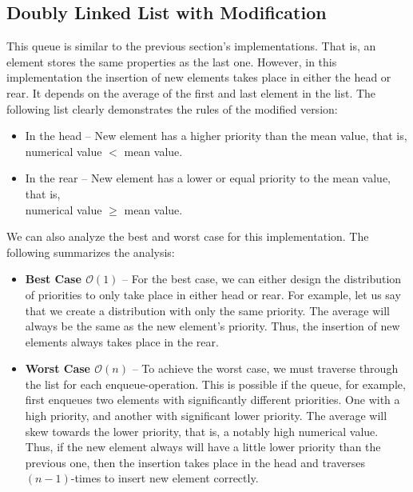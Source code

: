 \documentclass[a4paper,11pt]{kth-mag}
\newcommand*{\skippara}{\par\vspace{\baselineskip} \noindent}
\begin{document}
\subsection{Doubly Linked List with Modification}
This queue is similar to the previous section's implementations.
That is, an element stores the same properties as the last one.
However, in this implementation the insertion of new elements takes place in either the head or rear.
It depends on the average of the first and last element in the list.
The following list clearly demonstrates the rules of the modified version:
\begin{itemize}
    \item In the head -- New element has a higher priority than the mean value, that is, \\numerical value $<$ mean value.
    \item In the rear -- New element has a lower or equal priority to the mean value, that is,\\numerical value $\ge$ mean value.
\end{itemize}

\skippara We can also analyze the best and worst case for this implementation.
The following summarizes the analysis:
\begin{itemize}
    \item \textbf{Best Case $\mathcal{O}(1)$} -- For the best case, we can either design the distribution of priorities to only take place in either head or rear.
        For example, let us say that we create a distribution with only the same priority.
        The average will always be the same as the new element's priority.
        Thus, the insertion of new elements always takes place in the rear.
    \item \textbf{Worst Case $\mathcal{O}(n)$} -- To achieve the worst case, we must traverse through the list for each enqueue-operation.
        This is possible if the queue, for example, first enqueues two elements with significantly different priorities.
        One with a high priority, and another with significant lower priority.
        The average will skew towards the lower priority, that is, a notably high numerical value.
        Thus, if the new element always will have a little lower priority than the previous one, then the insertion takes place in the head and traverses $(n-1)$-times to insert new element correctly.
\end{itemize}
\end{document}
